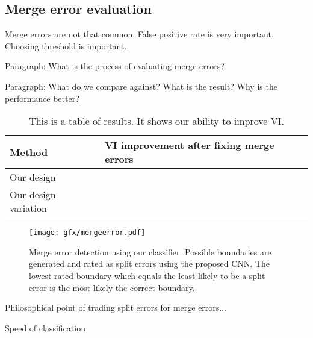 \subsection{Merge error evaluation}

Merge errors are not that common. False positive rate is very important. Choosing threshold is important.

Paragraph: What is the process of evaluating merge errors?

Paragraph: What do we compare against? What is the result? Why is the performance better?

\begin{table}[t]
\begin{tabular}{ll}
\toprule
Method & VI improvement after fixing merge errors \\
\midrule
Our design &  \\
Our design variation & \\
\bottomrule
\end{tabular}
\caption{This is a table of results. It shows our ability to improve VI.}
\end{table}

\begin{figure}[t]
\centering
\texttt{[image: gfx/mergeerror.pdf]}
\caption{Merge error detection using our classifier: Possible boundaries are generated and rated as split errors using the proposed CNN. The lowest rated boundary which equals the least likely to be a split error is the most likely the correct boundary.}
\label{fig:merge_error}
\end{figure}

Philosophical point of trading split errors for merge errors...


Speed of classification